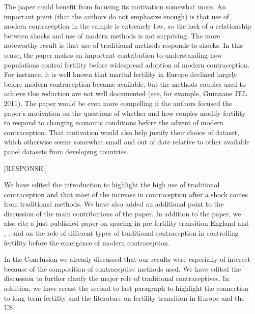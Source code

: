 \documentclass[letterpaper,12pt]{article}
\begin{document}
The paper could benefit from focusing its motivation somewhat more. An
important point (that the authors do not emphasize enough) is that use
of modern contraception in the sample is extremely low, so the lack of a
relationship between shocks and use of modern methods is not surprising.
The more noteworthy result is that use of traditional methods responds
to shocks. In this sense, the paper makes an important contribution to
understanding how populations control fertility before widespread
adoption of modern contraception. For instance, it is well known that
marital fertility in Europe declined largely before modern contraception
became available, but the methods couples used to achieve this reduction
are not well documented (see, for example, Guinnane JEL 2011). The paper
would be even more compelling if the authors focused the paper's
motivation on the questions of whether and how couples modify fertility
to respond to changing economic conditions before the advent of
modern contraception. That motivation would also help justify their
choice of dataset, which otherwise seems somewhat small and out of date
relative to other available panel datasets from developing countries.

[RESPONSE:]

We have edited the introduction to highlight the high use of traditional 
contraception and that most of the increase in contraception after a 
shock comes from traditional methods.
We have also added an additional point to the discussion of the
main contributions of the paper.
In addition to the \citet{Guinnane2011} paper, we also cite a just
published paper on spacing in pre-fertility transition England
\citep{Cinnirella2017} and \citet{Michael1976}, \citet{David1986},
and \citet{Santow1995}
on the role of different types of traditional contraception in
controlling fertility before the emergence of modern contraception.

In the Conclusion we already discussed that our results were
especially of interest because of the composition of contraceptive
methods used.
We have edited the discussion to further clarify the major role
of traditional contraceptives.
In addition, we have recast the second to last paragraph to
highlight the connection to long-term fertility and the literature
on fertility transition in Europe and the US.


\end{document}

